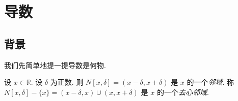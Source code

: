 \chapter{导数}

\section{背景}

我们先简单地提一提导数是何物.

\begin{definition}
    设 $x \in \mathbb{R}$. 设 $\delta$ 为正数. 则 $N[x, \delta] = (x - \delta, x + \delta)$ 是 $x$ 的一个\emph{邻域}. 称 $N[x, \delta] - \{ x \} = (x - \delta, x) \cup (x, x + \delta)$ 是 $x$ 的一个\emph{去心邻域}.
\end{definition}
